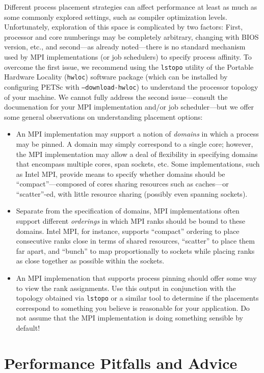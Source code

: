 {{Different process placement strategies can affect performance at least as much as some commonly explored settings, 
such as compiler optimization levels.
Unfortunately, exploration of this space is complicated by two factors: 
First, processor and core numberings may be completely arbitrary, changing with BIOS version, etc., and second---as 
already noted---there is no standard mechanism used by MPI implementations (or job schedulers) to specify 
process affinity.
To overcome the first issue, we recommend using the \texttt{lstopo} utility of the Portable Hardware Locality 
(\texttt{hwloc}) software package (which can be installed by configuring PETSc with \texttt{--download-hwloc}) to 
understand the processor topology of your machine.
We cannot fully address the second issue---consult the documenation for your MPI implementation and/or job 
scheduler---but we offer some general observations on understanding placement options: 
\begin{itemize}
\item An MPI implementation may support a notion of {\it domains} in which a process may be pinned.
  A domain may simply correspond to a single core; however, the MPI implementation may allow a deal of flexibility 
  in specifying domains that encompass multiple cores, span sockets, etc. 
  Some implementations, such as Intel MPI, provide means to specify whether domains should be ``compact''---composed 
  of cores sharing resources such as caches---or ``scatter''-ed, with little resource sharing (possibly even spanning 
  sockets).
\item Separate from the specification of domains, MPI implementations often support different {\it orderings} in which MPI
  ranks should be bound to these domains. Intel MPI, for instance, supports 
  ``compact'' ordering to place consecutive ranks close in terms of shared resources, ``scatter'' 
  to place them far apart, and ``bunch'' to map proportionally to sockets while placing ranks as close together as 
  possible within the sockets.
\item An MPI implemenation that supports process pinning should offer some way to view the rank assignments. 
  Use this output in conjunction with the topology obtained via \texttt{lstopo} or a similar tool to determine if the 
  placements correspond to something you believe is reasonable for your application. 
  Do not assume that the MPI implementation is doing something sensible by default!
\end{itemize}

\section{Performance Pitfalls and Advice}

}}

